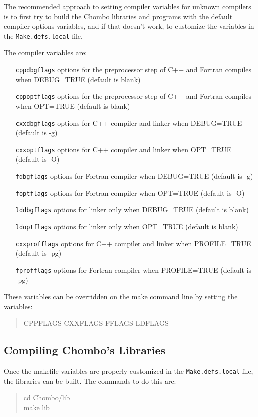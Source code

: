 The recommended approach to setting compiler variables for unknown compilers
is to first try to build the Chombo libraries and programs with the default
compiler options variables, and if that doesn't work, to customize the
variables in the {\tt Make.defs.local} file.

The compiler variables are:
\begin{itemize}
  \item[\tt cppdbgflags] options for the preprocessor step of C++ and Fortran compiles when
    DEBUG=TRUE (default is blank)
  \item[\tt cppoptflags] options for the preprocessor step of C++ and Fortran compiles when
    OPT=TRUE (default is blank)
  \item[\tt cxxdbgflags] options for C++ compiler and linker when DEBUG=TRUE (default is -g)
  \item[\tt cxxoptflags] options for C++ compiler and linker when OPT=TRUE (default is -O)
  \item[\tt fdbgflags] options for Fortran compiler when DEBUG=TRUE (default is -g)
  \item[\tt foptflags] options for Fortran compiler when OPT=TRUE (default is -O)
  \item[\tt lddbgflags] options for linker only when DEBUG=TRUE (default is blank)
  \item[\tt ldoptflags] options for linker only when OPT=TRUE (default is blank)
  \item[\tt cxxprofflags] options for C++ compiler and linker when PROFILE=TRUE (default is -pg)
  \item[\tt fprofflags] options for Fortran compiler when PROFILE=TRUE (default is -pg)
\end{itemize}

These variables can be overridden on the make command line by setting the variables:
\begin{quote}
CPPFLAGS CXXFLAGS FFLAGS LDFLAGS
\end{quote}

\subsection{Compiling Chombo's Libraries}\label{libsection}

Once the makefile variables are properly customized in the {\tt Make.defs.local}
file, the libraries can be built.  The commands to do this are:
\begin{quote}
 cd Chombo/lib\\
 make lib
\end{quote}

